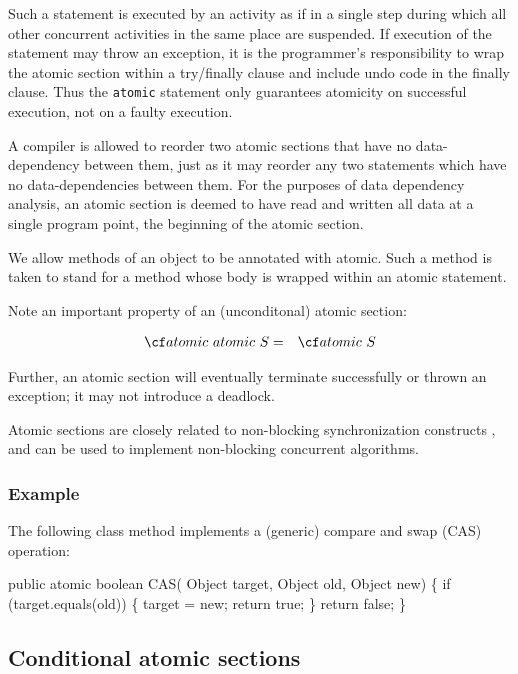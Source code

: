 {{Such a statement is executed by an activity as if in a single step
during which all other concurrent activities in the same place are
suspended. If execution of the statement may throw an exception, it is
the programmer's responsibility to wrap the atomic section within a
{\cf try/finally} clause and include undo code in the finally
clause. Thus the {\tt atomic} statement only guarantees atomicity on
successful execution, not on a faulty execution.

A compiler is allowed to reorder two atomic sections that have no
data-dependency between them, just as it may reorder any two
statements which have no data-dependencies between them. For the
purposes of data dependency analysis, an atomic section is deemed to
have read and written all data at a single program point, the
beginning of the atomic section.

We allow methods of an object to be annotated with {\cf atomic}. Such
a method is taken to stand for a method whose body is wrapped within an
{\cf atomic} statement.

Note an important property of an (unconditonal) atomic section:

\begin{eqnarray}
 {\cf atomic\ atomic}\ S &=& {\cf atomic}\ S
\end{eqnarray}

Further, an atomic section will eventually terminate successfully or
thrown an exception; it may not introduce a deadlock.

Atomic sections are closely related to non-blocking synchronization
constructs \cite{herlihy91waitfree}, and can be used to implement 
non-blocking concurrent algorithms.

\subsubsection{Example}

The following class method implements a (generic) compare and swap (CAS) operation:

\begin{x10}
public atomic boolean CAS( Object target, 
                           Object old, 
                           Object new) \{
   if (target.equals(old)) \{
     target = new;
     return true;
   \}
   return false;
\}
\end{x10}

\subsection{Conditional atomic sections}

}}
